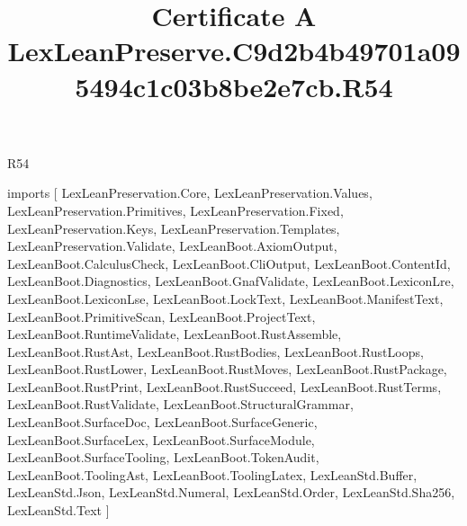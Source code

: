 \begin{lexlean}{R54}
\title{Certificate A LexLeanPreserve.C9d2b4b49701a095494c1c03b8be2e7cb.R54}
\begin{coremodule}
imports [
  LexLeanPreservation.Core,
  LexLeanPreservation.Values,
  LexLeanPreservation.Primitives,
  LexLeanPreservation.Fixed,
  LexLeanPreservation.Keys,
  LexLeanPreservation.Templates,
  LexLeanPreservation.Validate,
  LexLeanBoot.AxiomOutput,
  LexLeanBoot.CalculusCheck,
  LexLeanBoot.CliOutput,
  LexLeanBoot.ContentId,
  LexLeanBoot.Diagnostics,
  LexLeanBoot.GnafValidate,
  LexLeanBoot.LexiconLre,
  LexLeanBoot.LexiconLse,
  LexLeanBoot.LockText,
  LexLeanBoot.ManifestText,
  LexLeanBoot.PrimitiveScan,
  LexLeanBoot.ProjectText,
  LexLeanBoot.RuntimeValidate,
  LexLeanBoot.RustAssemble,
  LexLeanBoot.RustAst,
  LexLeanBoot.RustBodies,
  LexLeanBoot.RustLoops,
  LexLeanBoot.RustLower,
  LexLeanBoot.RustMoves,
  LexLeanBoot.RustPackage,
  LexLeanBoot.RustPrint,
  LexLeanBoot.RustSucceed,
  LexLeanBoot.RustTerms,
  LexLeanBoot.RustValidate,
  LexLeanBoot.StructuralGrammar,
  LexLeanBoot.SurfaceDoc,
  LexLeanBoot.SurfaceGeneric,
  LexLeanBoot.SurfaceLex,
  LexLeanBoot.SurfaceModule,
  LexLeanBoot.SurfaceTooling,
  LexLeanBoot.TokenAudit,
  LexLeanBoot.ToolingAst,
  LexLeanBoot.ToolingLatex,
  LexLeanStd.Buffer,
  LexLeanStd.Json,
  LexLeanStd.Numeral,
  LexLeanStd.Order,
  LexLeanStd.Sha256,
  LexLeanStd.Text
]


\end{coremodule}
\end{lexlean}
